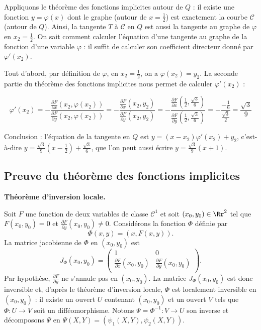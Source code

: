 \documentclass[11pt, class=report,crop=false]{standalone}
\begin{document}
   
Appliquons le théorème des fonctions implicites autour de $Q$ : il existe une fonction $y = \varphi(x)$ dont le graphe (autour de $x=\frac12$) est exactement la courbe $\mathcal{C}$ (autour de $Q$).
Ainsi, la tangente $T$ à $\mathcal{C}$ en $Q$ est aussi la tangente au graphe de $\varphi$ en $x_2=\frac12$. 
On sait comment calculer l'équation d'une tangente au graphe de la fonction d'une variable $\varphi$ : il suffit de calculer son coefficient directeur donné par
$\varphi'(x_2)$.

Tout d'abord, par définition de $\varphi$, en $x_2=\frac12$, on a $\varphi(x_2)=y_2$.
La seconde partie du théorème des fonctions implicites nous permet de calculer $\varphi'(x_2)$ :

$$
	\varphi'(x_2) 
	=    -\frac{\frac{\partial F}{\partial x}(x_2, \varphi(x_2))}{\frac{\partial F}{\partial y}(x_2, \varphi(x_2))} 
	= -\frac{\frac{\partial F}{\partial x}(x_2, y_2)}{\frac{\partial F}{\partial y}(x_2, y_2)} 
	= -\frac{\frac{\partial F}{\partial x}( \frac12,\frac{\sqrt3}{6} )}{\frac{\partial F}{\partial y}( \frac12,\frac{\sqrt3}{6}) }   
	= - \frac{-\frac16}{\frac{\sqrt3}{2}} 
	= \frac{\sqrt3}{9} 
$$

Conclusion : l'équation de la tangente en $Q$ est $y=(x-x_2)\varphi'(x_2)+ y_2$, c'est-à-dire
$y= \frac{\sqrt3}{9}(x-\frac12) + \frac{\sqrt3}{6}$,
que l'on peut aussi écrire $y=\frac{\sqrt3}{9}(x+1)$.

\subsection{Preuve du théorème des fonctions implicites}

\textbf{Théorème d'inversion locale.}

Soit $F$ une fonction  de deux variables de classe $\mathcal{C}^1$ et soit $(x_0,y_0) \in \Rr^2$ tel que $F(x_0,y_0)=0$ et $\frac{\partial F}{\partial y}(x_0,y_0)\neq 0$. Considérons la fonction $\Phi$ définie par
$$
\Phi(x,y)=(x,F(x,y)).
$$
La matrice jacobienne de $\Phi$ en $(x_0,y_0)$ est
$$
J_\Phi(x_0,y_0) = 
\begin{pmatrix}  1 & 0 \\
\frac{\partial F}{\partial x}(x_0,y_0) & \frac{\partial F}{\partial y}(x_0,y_0) \\ \end{pmatrix}.
$$
Par hypothèse, $\frac{\partial F}{\partial y}$ ne s'annule pas en $(x_0,y_0)$. La matrice $J_\Phi(x_0,y_0)$ est donc inversible et, d'après le théorème d'inversion locale, $\Phi$ est localement inversible en $(x_0,y_0)$ : il existe un ouvert $U$ contenant $(x_0,y_0)$ et un ouvert $V$ tels que $\Phi : U \to V$ soit un difféomorphisme. Notons $\Psi=\Phi^{-1} : V \to U$ son inverse et décomposons $\Psi$ en $\Psi(X,Y) = (\psi_1(X,Y),\psi_2(X,Y))$.
\end{document}
